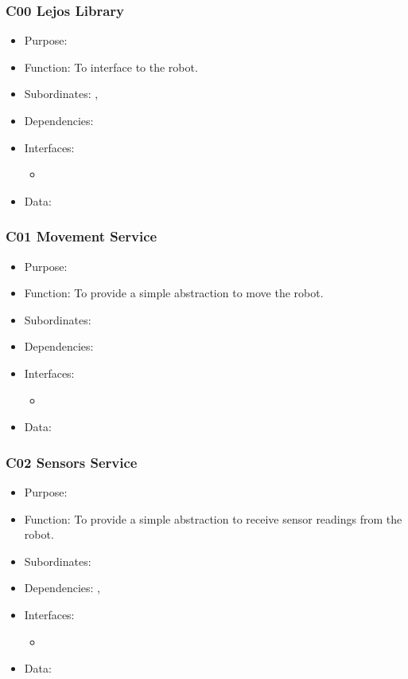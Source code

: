 \subsubsection{C00 Lejos Library}\label{compLejos}
\begin{itemize}
	\item Purpose: 
	\item Function: To interface to the robot. 
	\item Subordinates: , 
	\item Dependencies:
	\item Interfaces:
	\begin{itemize}
		\item
	\end{itemize}
	\item Data:
\end{itemize}

\subsubsection{C01 Movement Service} \label{compMove}
\begin{itemize}
	\item Purpose: 
	\item Function: To provide a simple abstraction to move the robot.
	\item Subordinates: 
	\item Dependencies: 
	\item Interfaces:
	\begin{itemize}
		\item
	\end{itemize}
	\item Data:
\end{itemize}

\subsubsection{C02 Sensors Service} \label{compSense}
\begin{itemize}
	\item Purpose: 
	\item Function: To provide a simple abstraction to receive sensor readings from the robot. 
	\item Subordinates: 
	\item Dependencies: , 
	\item Interfaces:
	\begin{itemize}
		\item
	\end{itemize}
	\item Data:
\end{itemize}

